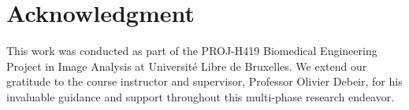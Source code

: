 \newpage
\section*{Acknowledgment}
This work was conducted as part of the PROJ-H419 Biomedical Engineering Project in Image Analysis at Université Libre de Bruxelles. We extend our gratitude to the course instructor and supervisor, Professor Olivier Debeir, for his invaluable guidance and support throughout this multi-phase research endeavor.